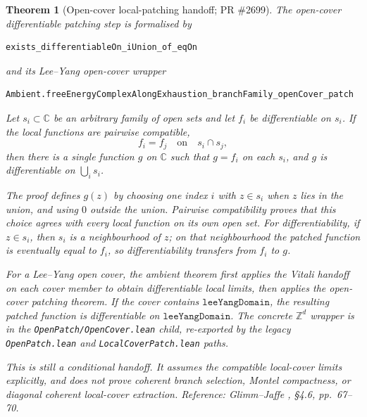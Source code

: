 \documentclass[a4paper,11pt]{article}
\newtheorem{theorem}{Theorem}
\begin{document}
\begin{theorem}[Open-cover local-patching handoff; PR \#2699]
The open-cover differentiable patching step is formalised by
\begin{Verbatim}
exists_differentiableOn_iUnion_of_eqOn
\end{Verbatim}
and its Lee--Yang open-cover wrapper
\begin{Verbatim}
Ambient.freeEnergyComplexAlongExhaustion_branchFamily_openCover_patch
\end{Verbatim}
Let \(s_i\subset\mathbb C\) be an arbitrary family of open sets and let
\(f_i\) be differentiable on \(s_i\).  If the local functions are pairwise
compatible,
\[
  f_i=f_j \quad\text{on}\quad s_i\cap s_j ,
\]
then there is a single function \(g\) on \(\mathbb C\) such that \(g=f_i\) on
each \(s_i\), and \(g\) is differentiable on \(\bigcup_i s_i\).

The proof defines \(g(z)\) by choosing one index \(i\) with \(z\in s_i\) when
\(z\) lies in the union, and using \(0\) outside the union.  Pairwise
compatibility proves that this choice agrees with every local function on its
own open set.  For differentiability, if \(z\in s_i\), then \(s_i\) is a
neighbourhood of \(z\); on that neighbourhood the patched function is
eventually equal to \(f_i\), so differentiability transfers from \(f_i\) to
\(g\).

For a Lee--Yang open cover, the ambient theorem first applies the Vitali
handoff on each cover member to obtain differentiable local limits, then
applies the open-cover patching theorem.  If the cover contains
\(\texttt{leeYangDomain}\), the resulting patched function is differentiable on
\(\texttt{leeYangDomain}\).  The concrete \(\mathbb Z^d\) wrapper is in the
\texttt{OpenPatch/OpenCover.lean} child, re-exported by the legacy
\texttt{OpenPatch.lean} and \texttt{LocalCoverPatch.lean} paths.

This is still a conditional handoff.  It assumes the compatible local-cover
limits explicitly, and does not prove coherent branch selection, Montel
compactness, or diagonal coherent local-cover extraction.
Reference: Glimm--Jaffe \cite{glimm-jaffe}, \S 4.6, pp.~67--70.
\end{theorem}
\end{document}
